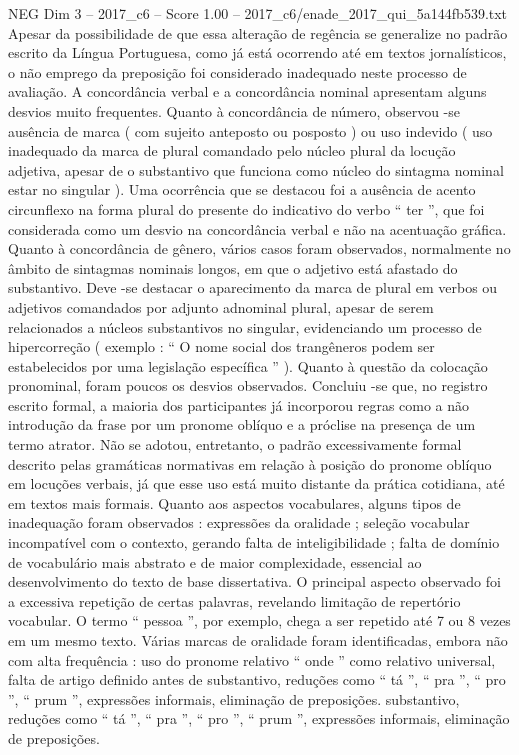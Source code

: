 \begin{textsample}{NEG Dim 3 – 2017\_c6 – Score 1.00 – 2017\_c6/enade\_2017\_qui\_5a144fb539.txt}
Apesar da possibilidade de que essa alteração de regência se generalize no padrão escrito da Língua Portuguesa, como já está ocorrendo até em textos jornalísticos, o não emprego da preposição foi considerado inadequado neste processo de avaliação.
A concordância verbal e a concordância nominal apresentam alguns desvios muito frequentes.
Quanto à concordância de número, observou -se ausência de marca ( com sujeito anteposto ou posposto ) ou uso indevido ( uso inadequado da marca de plural comandado pelo núcleo plural da locução adjetiva, apesar de o substantivo que funciona como núcleo do sintagma nominal estar no singular ).
Uma ocorrência que se destacou foi a ausência de acento circunflexo na forma plural do presente do indicativo do verbo “ ter ”, que foi considerada como um desvio na concordância verbal e não na acentuação gráfica.
Quanto à concordância de gênero, vários casos foram observados, normalmente no âmbito de sintagmas nominais longos, em que o adjetivo está afastado do substantivo.
Deve -se destacar o aparecimento da marca de plural em verbos ou adjetivos comandados por adjunto adnominal plural, apesar de serem relacionados a núcleos substantivos no singular, evidenciando um processo de hipercorreção ( exemplo : “ O nome social dos trangêneros podem ser estabelecidos por uma legislação específica ” ).
Quanto à questão da colocação pronominal, foram poucos os desvios observados.
Concluiu -se que, no registro escrito formal, a maioria dos participantes já incorporou regras como a não introdução da frase por um pronome oblíquo e a próclise na presença de um termo atrator.
Não se adotou, entretanto, o padrão excessivamente formal descrito pelas gramáticas normativas em relação à posição do pronome oblíquo em locuções verbais, já que esse uso está muito distante da prática cotidiana, até em textos mais formais.
Quanto aos aspectos vocabulares, alguns tipos de inadequação foram observados : expressões da oralidade ; seleção vocabular incompatível com o contexto, gerando falta de inteligibilidade ; falta de domínio de vocabulário mais abstrato e de maior complexidade, essencial ao desenvolvimento do texto de base dissertativa.
O principal aspecto observado foi a excessiva repetição de certas palavras, revelando limitação de repertório vocabular.
O termo “ pessoa ”, por exemplo, chega a ser repetido até 7 ou 8 vezes em um mesmo texto.
Várias marcas de oralidade foram identificadas, embora não com alta frequência : uso do pronome relativo “ onde ” como relativo universal, falta de artigo definido antes de substantivo, reduções como “ tá ”, “ pra ”, “ pro ”, “ prum ”, expressões informais, eliminação de preposições. substantivo, reduções como “ tá ”, “ pra ”, “ pro ”, “ prum ”, expressões informais, eliminação de preposições.

\end{textsample}
